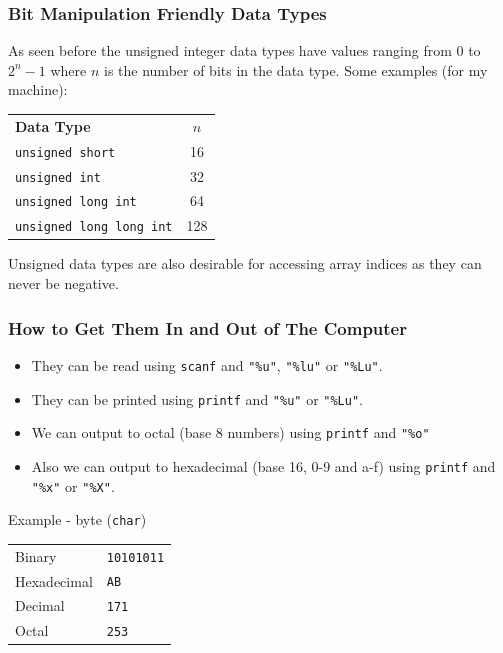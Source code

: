 \documentclass[table]{beamer}
\newif\ifschigh\schighfalse
\newcommand{\kt}[1]{\ifschigh\textcolor{red}{#1}\else\textcolor{ctext}{#1}\fi}
\begin{document}
\begin{frame}
\frametitle{Bit Manipulation Friendly Data Types}
As seen before the unsigned integer data types have values ranging from 0 to $2^n-1$ where $n$ is the number of bits in the data type. Some examples (for my machine):
\begin{center}
\begin{tabular}{l c}
\bf Data Type&\bf$n$\\
\tt unsigned short& 16\\
\tt unsigned int&32\\
\tt unsigned long int&64\\
\tt unsigned long long int&128
\end{tabular}
\end{center}
Unsigned data types are also desirable for accessing array indices as they can never be negative.
\end{frame}

\begin{frame}
\frametitle{How to Get Them In and Out of The Computer}
\begin{itemize}
\item They can be read using {\tt scanf} and {\tt \kt{"\%u"}}, {\tt \kt{"\%lu"}}
 or {\tt \kt{"\%Lu"}}.
\item They can be printed using {\tt printf} and {\tt \kt{"\%u"}} or {\tt \kt{"\%Lu"}}.
\item We can output to octal (base 8 numbers) using {\tt printf} and {\tt \kt{"\%o"}}
\item Also we can output to hexadecimal (base 16, 0-9 and a-f) using {\tt printf} and {\tt \kt{"\%x"}} or {\tt \kt{"\%X"}}.
\end{itemize}
\begin{block}{Example - byte ({\tt char})}
\begin{tabular}{l l}
Binary&\tt10101011\\
Hexadecimal&\tt AB\\
Decimal&\tt171\\
Octal&\tt253
\end{tabular}
\end{block}
\end{frame}
\end{document}
